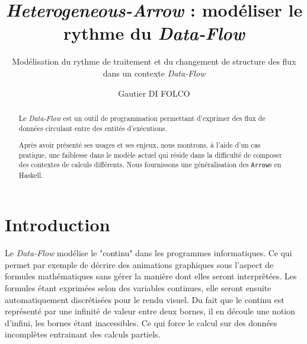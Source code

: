 \documentclass{llncs}
\newcommand{\DF}{\emph{Data-Flow} }
\newcommand{\SA}{\emph{Heterogeneous-Arrow} }
\newcommand{\Arrs}{\lstinline{Arrow}s }
\begin{document}
\title{\SA : modéliser le rythme du \DF}


\subtitle{Modélisation du rythme de traitement et du changement de structure des flux dans un contexte \DF}


\author{Gautier DI FOLCO}







\maketitle

\begin{abstract}
Le \DF est un outil de programmation permettant d'exprimer des flux de
données circulant entre des entités d'exécutions.

Après avoir présenté ses usages et ses enjeux, nous montrons, à l'aide d'un
cas pratique, une faiblesse dans le modèle actuel qui réside dans la difficulté
de composer des contextes de calculs différents.
Nous fournissons une généralisation des \Arrs en Haskell.
\end{abstract}

\section{Introduction}
Le \DF modélise le "continu" dans les programmes informatiques.
Ce qui permet par exemple de décrire des animations graphiques sous l'aspect de
formules mathématiques sans gérer la manière dont elles seront interprêtées.
Les formules étant exprimées selon des variables continues, elle seront ensuite
automatiquement discrétisées pour le rendu visuel.
Du fait que le continu est représenté par une infinité de valeur entre deux bornes,
il en découle une notion d'infini, les bornes étant inacessibles.
Ce qui force le calcul sur des données incomplètes entrainant des calculs partiels.
\end{document}
